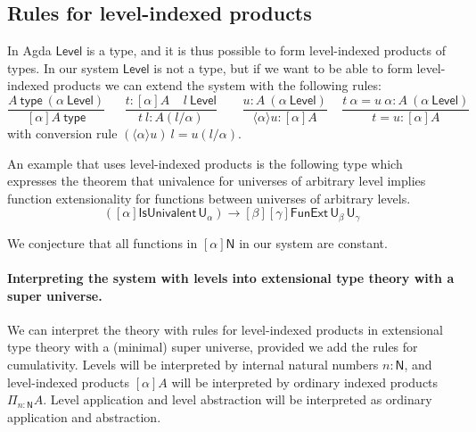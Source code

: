 \documentclass[11pt,a4paper]{article}
\newcommand{\lam}[2]{{\langle}#1{\rangle}#2}
\def\NN{\mathsf{N}}
\def\UU{\mathsf{U}}
\def\Level{\mathsf{Level}}
\newcommand{\type}{\mathsf{type}}
\newcommand{\T}{\mathsf{T}}
\begin{document}
%
%
%
%
%
%
%

\subsection*{Rules for level-indexed products}

In Agda $\Level$ is a type, and it is thus possible to form level-indexed products of types. In our system $\Level$ is not a type, but if we want to be able to form level-indexed products we can extend the system with the following rules:
$$
\frac{A~\type~(\alpha~\Level)}{[\alpha]A~\type}~~~~~~~
\frac{t:[\alpha]A~~~~~l~\Level}
     {t~l:A(l/\alpha)}~~~~~~~~~
\frac{u:A~(\alpha~\Level)}{\lam{\alpha}{u}: [\alpha]A}~~~~~
\frac{t~\alpha = u~\alpha:A~(\alpha~\Level)}{t = u:[\alpha]A}
$$
with conversion rule $(\lam{\alpha}{u})~l = u(l/\alpha)$.

An example that uses level-indexed products is the following type which  expresses the theorem that univalence for universes of arbitrary level implies function extensionality for functions between universes of arbitrary levels.
$$
([\alpha]\mathsf{IsUnivalent}\, \UU_\alpha)
\to [\beta][\gamma] \mathsf{FunExt}\, \UU_\beta\, \UU_\gamma
$$

We conjecture that all functions in $[\alpha]\NN$ in our system
are constant.

\paragraph{Interpreting the system with levels into extensional type theory with a super universe.} We can interpret the theory with rules for level-indexed products in extensional type theory with a (minimal) super universe, provided we add the rules for cumulativity. Levels will be interpreted by internal natural numbers $n : \NN$, and level-indexed products $[\alpha]A$ will be interpreted by ordinary indexed products $\Pi_{n : \NN}A$. Level application and level abstraction will be interpreted as ordinary application and abstraction.
\end{document}
